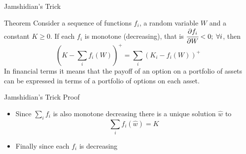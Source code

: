 \documentclass{beamer}
\begin{document}
\begin{frame}{Jamshidian's Trick}
\begin{block}{Theorem}
	Consider a sequence of functions $f_i$, a random variable $W$ and a constant $K\ge0$. If each $f_i$ is monotone (decreasing), that is $\cfrac{\partial f_i}{\partial W} < 0;\;\forall i$, then 
	\begin{equation*}
		\left(K - \sum_i f_i(W)\right)^+ = 	\sum_i \left(K_i - f_i(W)\right)^+
	\end{equation*} 
	In financial terms it means that the payoff of an option on a portfolio of assets can be expressed in terms of a portfolio of options on each asset.
\end{block}
\end{frame}

\begin{frame}{Jamshidian's Trick Proof}
\begin{itemize}
	\item Since $\sum_i f_i$ is also monotone decreasing there is a unique solution $\hat{w}$ to 
	\begin{equation*}
		\sum_i f_i(\hat{w}) = K
	\end{equation*}
	\item<2-> Finally since each $f_i$ is decreasing
	\begin{columns}

\end{columns}
\end{itemize}
\end{frame}
\end{document}
